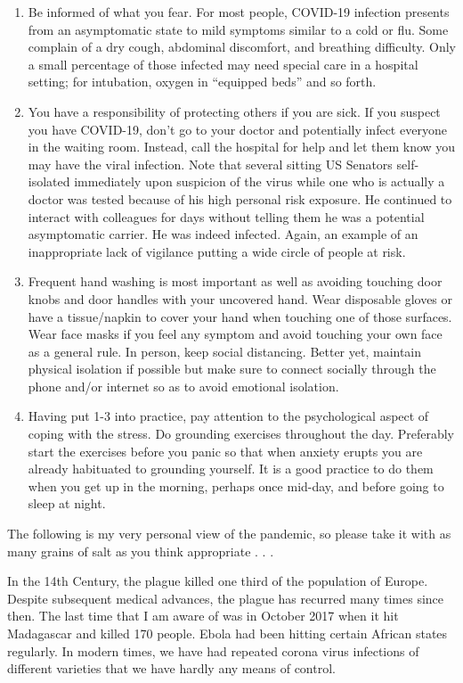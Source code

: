 \documentclass[]{book}
\begin{document}
\begin{enumerate}
\def\labelenumi{\arabic{enumi}.}
\item
  Be informed of what you fear. For most people, COVID-19 infection presents from an asymptomatic state to mild symptoms similar to a cold or flu. Some complain of a dry cough, abdominal discomfort, and breathing difficulty. Only a small percentage of those infected may need special care in a hospital setting; for intubation, oxygen in ``equipped beds'' and so forth.
\item
  You have a responsibility of protecting others if you are sick. If you suspect you have COVID-19, don't go to your doctor and potentially infect everyone in the waiting room. Instead, call the hospital for help and let them know you may have the viral infection. Note that several sitting US Senators self-isolated immediately upon suspicion of the virus while one who is actually a doctor was tested because of his high personal risk exposure. He continued to interact with colleagues for days without telling them he was a potential asymptomatic carrier. He was indeed infected. Again, an example of an inappropriate lack of vigilance putting a wide circle of people at risk.
\item
  Frequent hand washing is most important as well as avoiding touching door knobs and door handles with your uncovered hand. Wear disposable gloves or have a tissue/napkin to cover your hand when touching one of those surfaces. Wear face masks if you feel any symptom and avoid touching your own face as a general rule. In person, keep social distancing. Better yet, maintain physical isolation if possible but make sure to connect socially through the phone and/or internet so as to avoid emotional isolation.
\item
  Having put 1-3 into practice, pay attention to the psychological aspect of coping with the stress. Do grounding exercises throughout the day. Preferably start the exercises before you panic so that when anxiety erupts you are already habituated to grounding yourself. It is a good practice to do them when you get up in the morning, perhaps once mid-day, and before going to sleep at night.
\end{enumerate}

The following is my very personal view of the pandemic, so please take it with as many grains of salt as you think appropriate . . .

In the 14th Century, the plague killed one third of the population of Europe. Despite subsequent medical advances, the plague has recurred many times since then. The last time that I am aware of was in October 2017 when it hit Madagascar and killed 170 people. Ebola had been hitting certain African states regularly. In modern times, we have had repeated corona virus infections of different varieties that we have hardly any means of control.
\end{document}
